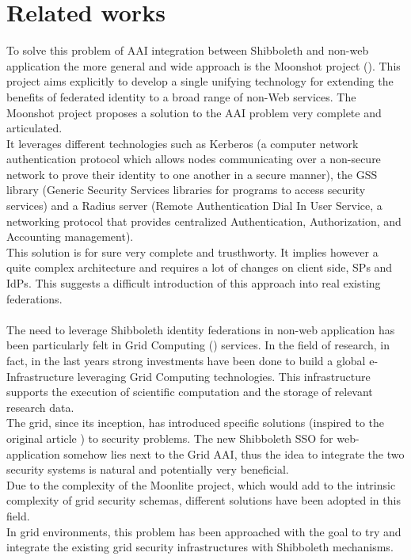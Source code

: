 \section{Related works}
To solve this problem of AAI integration between Shibboleth and non-web application the more general and wide approach is the Moonshot project (\cite{Howlett-2010}).
This project aims explicitly to develop a single unifying technology for extending the benefits of federated identity to a broad range of non-Web services.
The Moonshot project proposes a solution to the AAI problem very complete and articulated.\\
It leverages different technologies such as Kerberos (a computer network authentication protocol which allows nodes communicating over a non-secure network to prove their
identity to one another in a secure manner), the GSS library (Generic Security Services libraries for programs to access security services) and a Radius server (Remote
Authentication Dial In User Service, a networking protocol that provides centralized Authentication, Authorization, and Accounting management).\\
This solution is for sure very complete and trusthworty.
It implies however a quite complex architecture and requires a lot of changes on client side, SPs and IdPs.
This suggests a difficult introduction of this approach into real existing federations.\\
\\
The need to leverage Shibboleth identity federations in non-web application has been particularly felt in Grid Computing (\cite{Kesselman-1998}) services.
In the field of research, in fact, in the last years strong investments have been done to build a global e-Infrastructure leveraging Grid Computing technologies.
This infrastructure supports the execution of scientific computation and the storage of relevant research data.\\
The grid, since its inception, has introduced specific solutions (inspired to the original article \cite{Foster-1998}) to security problems.
The new Shibboleth SSO for web-application somehow lies next to the Grid AAI, thus the idea to integrate the two security systems is natural and potentially very beneficial.\\
Due to the complexity of the Moonlite project, which would add to the intrinsic complexity of grid security schemas, different solutions have been adopted in this field.
\\
In grid environments, this problem has been approached with the goal to try and integrate the existing grid security infrastructures with Shibboleth mechanisms.
